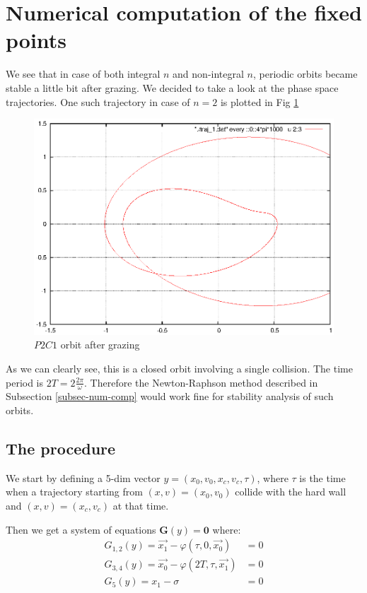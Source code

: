 \documentclass{book}
\renewcommand{\(}{\begin{columns}}
\renewcommand{\)}{\end{columns}}
\newcommand{\<}[1]{\begin{column}{#1}}
\renewcommand{\>}{\end{column}}
\newcommand{\mb}[1]{\mathbf{#1}}
\begin{document}
\section{Numerical computation of the fixed points}
We see that in case of both integral $n$ and non-integral $n$,  periodic 
orbits became stable a little bit 
after grazing.  We decided to take a look at the phase 
space trajectories. One such trajectory in case of $n=2$ is plotted in Fig \ref{fig-traj-p2c1}
\begin{figure}[!htp]
\caption{$P2C1$ orbit after grazing}
\label{fig-traj-p2c1}
\begin{center}
\includegraphics[width=0.9\columnwidth]{after-grazing-p1-traj}
\end{center}
\end{figure}

As we can clearly see, this is a closed orbit involving a single collision.  
The time period is $2T=2\frac{2\pi}{\omega}$.  Therefore the Newton-Raphson 
method described in Subsection \ref{subsec-num-comp} would work fine for 
stability analysis of such orbits.  

\subsection{The procedure}
We start by defining a 5-dim vector $y=(x_0,v_0,x_c,v_c,\tau)$, where $\tau$ 
is the time when a trajectory starting from $(x,v)=(x_0,v_0)$ collide with the 
hard wall and $(x,v)=(x_c,v_c)$ at that time.  

Then we get a system of equations $\mb{G}(y)=\mb{0}$ where:
\begin{align*}
G_{1,2}(y)=\vec{x_1}-\varphi(\tau,0,\vec{x_0})&=0\\
G_{3,4}(y)=\vec{x_0}-\varphi(2T,\tau,\vec{x_1})&=0\\
G_5(y)=x_1-\sigma&=0
\end{align*}
\end{document}

